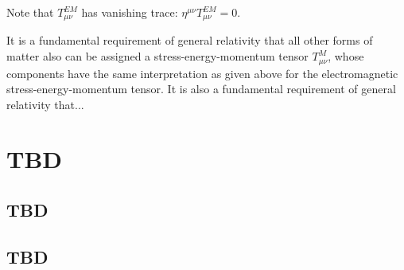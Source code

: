 Note that $T^{EM}_{\mu \nu}$ has vanishing trace: $\eta^{\mu \nu}T^{EM}_{\mu \nu} = 0$.  

It is a fundamental requirement of general relativity that all other forms of matter also can be assigned a stress-energy-momentum tensor $T^M_{\mu \nu}$, whose components have the same interpretation as given above for the electromagnetic stress-energy-momentum tensor. It is also a fundamental requirement of general relativity that...









 


\section{TBD}
\label{sec:Wald_08.3}

\subsection{TBD}
\label{subsec:Wald_08.3.1}

\subsection{TBD}
\label{subsec:Wald_08.3.2}